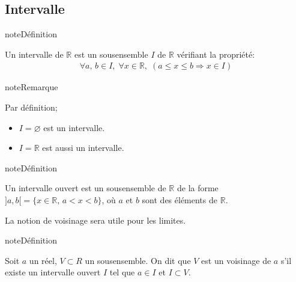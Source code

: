 \documentclass[letterpaper,10pt,french]{jupyterBook}
\begin{document}
\subsection{Intervalle}
\label{\detokenize{proprties:intervalle}}
\begin{sphinxadmonition}{note}{Définition}

\sphinxAtStartPar
Un intervalle de \(\mathbb{R}\) est un sous\sphinxhyphen{}ensemble \(I\) de \(\mathbb{R}\) vérifiant la propriété:
\begin{equation*}
\begin{split}
\forall a,\,b\in I,\;\forall x\in \mathbb{R},\;(a\leqslant x\leqslant b\Rightarrow x\in I)
\end{split}
\end{equation*}\end{sphinxadmonition}

\begin{sphinxadmonition}{note}{Remarque}

\sphinxAtStartPar
Par définition;
\begin{itemize}
\item {} 
\sphinxAtStartPar
\(I=\varnothing\) est un intervalle.

\item {} 
\sphinxAtStartPar
\(I=\mathbb{R}\) est aussi un intervalle.

\end{itemize}
\end{sphinxadmonition}

\begin{sphinxadmonition}{note}{Définition}

\sphinxAtStartPar
Un intervalle ouvert est un sous\sphinxhyphen{}ensemble de \(\mathbb{R}\) de la forme \(]a,b[= \{x\in \mathbb{R},\,a<x<b\}\), où \(a\) et \(b\) sont des éléments de \(\mathbb{R}.\)
\end{sphinxadmonition}

\sphinxAtStartPar
La notion de voisinage sera utile pour les limites.

\begin{sphinxadmonition}{note}{Définition}

\sphinxAtStartPar
Soit \(a\) un réel, \(V\subset R\) un sous\sphinxhyphen{}ensemble. On dit que \(V\) est un voisinage de \(a\) s’il existe un intervalle ouvert \(I\) tel que \(a \in I\) et \(I \subset V.\)
\end{sphinxadmonition}
\end{document}

